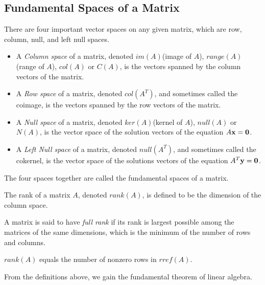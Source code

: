 \documentclass{report}
\begin{document}
		\subsection{Fundamental Spaces of a Matrix}
		There are four important vector spaces on any given matrix, which are row, column, null, and left null spaces.
		\begin{defn}
			\begin{itemize}
				\item A \emph{Column space} of a matrix, denoted $im(A)$(image of $A$), $range(A)$(range of $A$), $col(A)$ or $C(A)$, is the vectors spanned by the column vectors of the matrix.
				\item A \emph{Row space} of a matrix, denoted $col(A^T)$, and sometimes called the coimage, is the vectors spanned by the row vectors of the matrix.
				\item A \emph{Null space} of a matrix, denoted $ker(A)$(kernel of $A$), $null(A)$ or $N(A)$, is the vector space of the solution vectors of the equation $A\bf{x}=\bf{0}$.
				\item A \emph{Left Null space} of a matrix, denoted $null(A^T)$, and sometimes called the cokernel, is the vector space of the solutions vectors of the equation $A^T\bf{y}=\bf{0}$.
			\end{itemize}
			The four spaces together are called the fundamental spaces of a matrix.
		\end{defn}
		
		\begin{defn}
			The rank of a matrix $A$, denoted $rank(A)$, is defined to be the dimension of the column space.
		\end{defn}
		
		\begin{defn}
			A matrix is said to have \emph{full rank} if its rank is largest possible among the matrices of the same dimensions, which is the minimum of the number of rows and columns.
		\end{defn}
		
		\begin{thm}
			$rank(A)$ equals the number of nonzero rows in $rref(A)$.
		\end{thm}
		
		From the definitions above, we gain the fundamental theorem of linear algebra.
		
\end{document}
